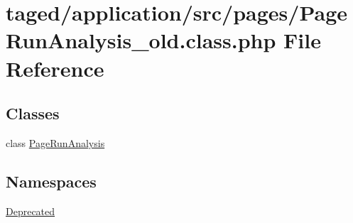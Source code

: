 \hypertarget{_page_run_analysis__old_8class_8php}{}\section{taged/application/src/pages/\+Page\+Run\+Analysis\+\_\+old.class.\+php File Reference}
\label{_page_run_analysis__old_8class_8php}
\subsection*{Classes}
\begin{DoxyCompactItemize}
\item 
class \hyperlink{class_page_run_analysis}{Page\+Run\+Analysis}
\end{DoxyCompactItemize}
\subsection*{Namespaces}
\begin{DoxyCompactItemize}
\item 
 \hyperlink{namespace_deprecated}{Deprecated}
\end{DoxyCompactItemize}
